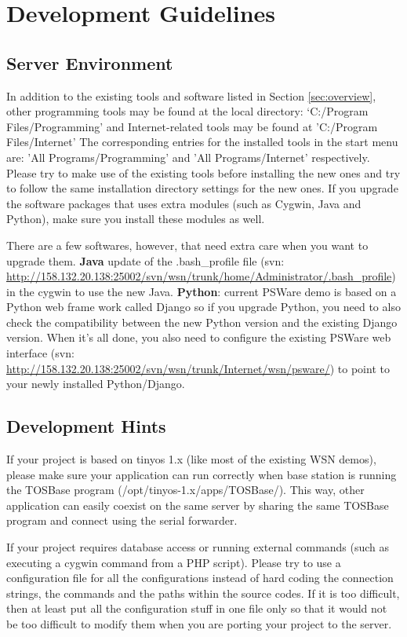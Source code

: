 \section{Development Guidelines}
\subsection{Server Environment}
\label{sec:environment}
In addition to the existing tools and software listed in Section \ref{sec:overview}, other programming tools may be found at the local directory: `C:/Program Files/Programming' and Internet-related tools may be found at 'C:/Program Files/Internet'
The corresponding entries for the installed tools in the start menu are: 'All Programs/Programming' and 'All Programs/Internet' respectively. Please try to make use of the existing tools before installing the new ones and try to follow the same installation directory settings for the new ones. If you upgrade the software packages that uses extra modules (such as Cygwin, Java and Python), make sure you install these modules as well.

There are a few softwares, however, that need extra care when you want to upgrade them. \textbf{Java} update of the .bash\_profile file (svn: \url{http://158.132.20.138:25002/svn/wsn/trunk/home/Administrator/.bash_profile}) in the cygwin to use the new Java. \textbf{Python}: current PSWare demo is based on a Python web frame work called Django so if you upgrade Python, you need to also check the compatibility between the new Python version and the existing Django version. When it's all done, you also need to configure the existing PSWare web interface (svn: \url{http://158.132.20.138:25002/svn/wsn/trunk/Internet/wsn/psware/}) to point to your newly installed Python/Django.

\subsection{Development Hints}
\label{sec:hints}
If your project is based on tinyos 1.x (like most of the existing WSN demos), please make sure your application can run correctly when base station is running the TOSBase program (/opt/tinyos-1.x/apps/TOSBase/). This way, other application can easily coexist on the same server by sharing the same TOSBase program and connect using the serial forwarder.

If your project requires database access or running external commands (such as executing a cygwin command from a PHP script). Please try to use a configuration file for all the configurations instead of hard coding the connection strings, the commands and the paths within the source codes. If it is too difficult, then at least put all the configuration stuff in one file only so that it would not be too difficult to modify them when you are porting your project to the server.

